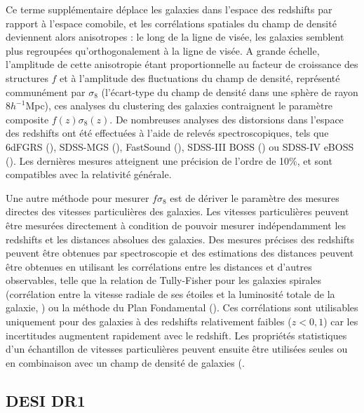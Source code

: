 \documentclass{book}
\begin{document}
Ce terme supplémentaire déplace les galaxies dans l'espace des redshifts par rapport à l'espace comobile, et les corrélations spatiales du champ de densité deviennent alors anisotropes : le long de la ligne de visée, les galaxies semblent plus regroupées qu'orthogonalement à la ligne de visée. A grande échelle, l'amplitude de cette anisotropie étant proportionnelle au facteur de croissance des structures $f$ et à l'amplitude des fluctuations du champ de densité, représenté communément par $\sigma_8$ (l'écart-type du champ de densité dans une sphère de rayon 8$h^{-1}$Mpc), ces analyses du clustering des galaxies contraignent le paramètre composite $f(z)\sigma_8(z)$. De nombreuses analyses des distorsions dans l'espace des redshifts ont été effectuées à l'aide de relevés spectroscopiques, tels que 6dFGRS (\cite{beutler_6df_2012}), SDSS-MGS (\cite{howlett_clustering_2015}), FastSound (\cite{okumura_subaru_2016}), SDSS-III BOSS (\cite{alam_clustering_2017}) ou SDSS-IV eBOSS (\cite{eboss_collaboration_completed_2021}). Les dernières mesures atteignent une précision de l'ordre de 10\%, et sont compatibles avec la relativité générale.

Une autre méthode pour mesurer $f\sigma_8$ est de dériver le paramètre des mesures directes des vitesses particulières des galaxies. Les vitesses particulières peuvent être mesurées directement à condition de pouvoir mesurer indépendamment les redshifts et les distances absolues des galaxies. Des mesures précises des redshifts peuvent être obtenues par spectroscopie et des estimations des distances peuvent être obtenues en utilisant les corrélations entre les distances et d'autres observables, telle que la relation de Tully-Fisher pour les galaxies spirales (corrélation entre la vitesse radiale de ses étoiles et la luminosité totale de la galaxie, \cite{tully_new_1977}) ou la méthode du Plan Fondamental (\cite{djorgovski_fundamental_1987}). Ces corrélations sont utilisables uniquement pour des galaxies à des redshifts relativement faibles ($z < 0,1$) car les incertitudes augmentent rapidement avec le redshift. Les propriétés statistiques d'un échantillon de vitesses particulières peuvent ensuite être utilisées seules ou en combinaison avec un champ de densité de galaxies (\cite{adams_joint_2020, qin_redshift_2019, turner_local_2023}.

\subsection{DESI DR1}
\end{document}
